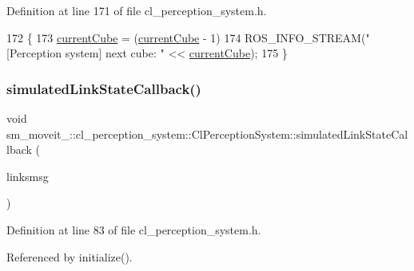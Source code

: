 Definition at line 171 of file cl\+\_\+perception\+\_\+system.\+h.


\begin{DoxyCode}
172   \{
173     \hyperlink{classsm__moveit__3_1_1cl__perception__system_1_1ClPerceptionSystem_ad915fc687481d4157ec40de52f8eaa82}{currentCube} = (\hyperlink{classsm__moveit__3_1_1cl__perception__system_1_1ClPerceptionSystem_ad915fc687481d4157ec40de52f8eaa82}{currentCube} - 1) %
174     ROS\_INFO\_STREAM(\textcolor{stringliteral}{"[Perception system] next cube: "} << \hyperlink{classsm__moveit__3_1_1cl__perception__system_1_1ClPerceptionSystem_ad915fc687481d4157ec40de52f8eaa82}{currentCube});
175   \}
\end{DoxyCode}
\mbox{\label{classsm__moveit__3_1_1cl__perception__system_1_1ClPerceptionSystem_a540c3a50c29e6ec58f6fcd7e993d9dff}} 
\subsubsection{\texorpdfstring{simulated\+Link\+State\+Callback()}{simulatedLinkStateCallback()}}
{\footnotesize\ttfamily void sm\+\_\+moveit\+\_\+::cl\+\_\+perception\+\_\+system\+::\+Cl\+Perception\+System\+::simulated\+Link\+State\+Callback (\begin{DoxyParamCaption}\item[{const gazebo\+\_\+msgs\+::\+Link\+States \&}]{linksmsg }\end{DoxyParamCaption})\hspace{0.3cm}{\ttfamily [inline]}}



Definition at line 83 of file cl\+\_\+perception\+\_\+system.\+h.



Referenced by initialize().


